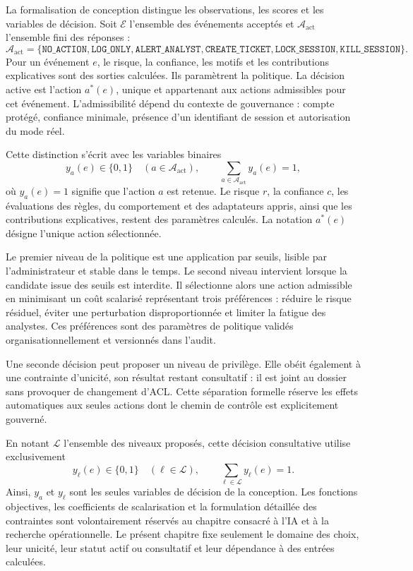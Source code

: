 \documentclass[11pt,a4paper,oneside]{report}
\theoremstyle{definition}
\theoremstyle{plain}
\begin{document}
La formalisation de conception distingue les observations, les scores et les
variables de décision. Soit \(\mathcal{E}\) l'ensemble des événements acceptés
et \(\mathcal{A}_{\mathrm{act}}\) l'ensemble fini des réponses :
\[
\mathcal{A}_{\mathrm{act}}=
\{\texttt{NO\_ACTION},\texttt{LOG\_ONLY},\texttt{ALERT\_ANALYST},
\texttt{CREATE\_TICKET},\texttt{LOCK\_SESSION},\texttt{KILL\_SESSION}\}.
\]
Pour un événement \(e\), le risque, la confiance, les motifs et les
contributions explicatives sont des sorties calculées. Ils paramètrent la
politique. La décision active est l'action \(a^*(e)\), unique et appartenant
aux actions admissibles pour cet événement. L'admissibilité dépend du contexte
de gouvernance : compte protégé, confiance minimale, présence d'un identifiant
de session et autorisation du mode réel.

Cette distinction s'écrit avec les variables binaires
\[
y_a(e)\in\{0,1\}\quad(a\in\mathcal{A}_{\mathrm{act}}),
\qquad
\sum_{a\in\mathcal{A}_{\mathrm{act}}}y_a(e)=1,
\]
où \(y_a(e)=1\) signifie que l'action \(a\) est retenue. Le risque \(r\), la
confiance \(c\), les évaluations des règles, du comportement et des
adaptateurs appris, ainsi que les contributions explicatives, restent des
paramètres calculés. La notation \(a^*(e)\) désigne l'unique action sélectionnée.

Le premier niveau de la politique est une application par seuils, lisible par
l'administrateur et stable dans le temps. Le second niveau intervient lorsque
la candidate issue des seuils est interdite. Il sélectionne alors une action
admissible en minimisant un coût scalarisé représentant trois préférences :
réduire le risque résiduel, éviter une perturbation disproportionnée et limiter
la fatigue des analystes. Ces préférences sont des paramètres de politique
validés organisationnellement et versionnés dans l'audit.

Une seconde décision peut proposer un niveau de privilège. Elle obéit également
à une contrainte d'unicité, son résultat restant consultatif : il est joint
au dossier sans provoquer de changement d'ACL. Cette séparation formelle
réserve les effets automatiques aux seules actions dont le chemin de contrôle
est explicitement gouverné.

En notant \(\mathcal{L}\) l'ensemble des niveaux proposés, cette décision
consultative utilise exclusivement
\[
y_\ell(e)\in\{0,1\}\quad(\ell\in\mathcal{L}),
\qquad
\sum_{\ell\in\mathcal{L}}y_\ell(e)=1.
\]
Ainsi, \(y_a\) et \(y_\ell\) sont les seules variables de décision de la
conception. Les fonctions objectives, les coefficients de scalarisation et la
formulation détaillée des contraintes sont volontairement réservés au chapitre
consacré à l'IA et à la recherche opérationnelle. Le présent chapitre fixe
seulement le domaine des choix, leur unicité, leur statut actif ou consultatif
et leur dépendance à des entrées calculées.
\end{document}
